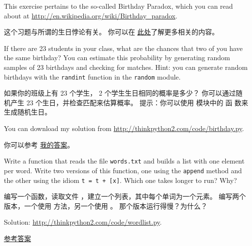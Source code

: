 \begin{exercise}

This exercise pertains to the so-called Birthday Paradox, which you
can read about at \url{http://en.wikipedia.org/wiki/Birthday_paradox}.

这个习题与所谓的生日悖论有关。
你可以在 \href{http://en.wikipedia.org/wiki/Birthday_paradox}{此处}了解更多相关的内容。

If there are 23 students in your class, what are the chances
that two of you have the same birthday?  You can estimate this
probability by generating random samples of 23 birthdays
and checking for matches.  Hint: you can generate random birthdays
with the {\tt randint} function in the {\tt random} module.

如果你的班级上有 23 个学生， 2 个学生生日相同的概率是多少？
你可以通过随机产生 23 个生日，并检查匹配来估算概率。
提示：你可以使用  模块中的  函
数来生成随机生日。

  
  

You can download my
solution from \url{http://thinkpython2.com/code/birthday.py}.

你可以参考 \href{http://thinkpython2.com/code/birthday.py}{我的答案}。

\end{exercise}



\begin{exercise}
  
  

Write a function that reads the file {\tt words.txt} and builds
a list with one element per word.  Write two versions of
this function, one using the {\tt append} method and the
other using the idiom {\tt t = t + [x]}.  Which one takes
longer to run?  Why?

编写一个函数，读取文件 ，建立一个列表，其中每个单词为一个元素。
编写两个版本，一个使用  方法，另一个使用 。
那个版本运行得慢？为什么？

Solution: \url{http://thinkpython2.com/code/wordlist.py}.

\href{http://thinkpython2.com/code/wordlist.py}{参考答案}

  

\end{exercise}


